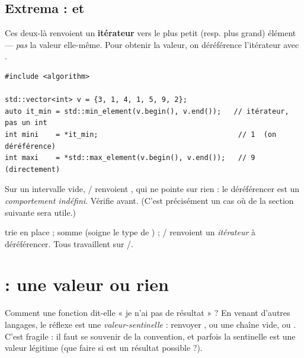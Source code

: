 \documentclass[11pt]{article}
\begin{document}
\subsection*{Extrema :  et }

Ces deux-là renvoient un \textbf{itérateur} vers le plus petit (resp. plus
grand) élément — \emph{pas} la valeur elle-même. Pour obtenir la valeur, on
déréférence l'itérateur avec \code{*}.

\begin{lstlisting}
#include <algorithm>

std::vector<int> v = {3, 1, 4, 1, 5, 9, 2};
auto it_min = std::min_element(v.begin(), v.end());   // itérateur, pas un int
int mini    = *it_min;                                 // 1  (on déréférence)
int maxi    = *std::max_element(v.begin(), v.end());   // 9  (directement)
\end{lstlisting}

\begin{piege}
Sur un intervalle vide, / renvoient
, qui ne pointe sur rien : le déréférencer est un \emph{comportement
indéfini}. Vérifie  avant. (C'est précisément un cas où
 de la section suivante sera utile.)
\end{piege}

\begin{aretenir}
 trie en place ;
 somme (soigne le type de ) ;
/ renvoient un \emph{itérateur} à
déréférencer. Tous travaillent sur /.
\end{aretenir}

\section{ : une valeur ou rien}

Comment une fonction dit-elle « je n'ai pas de résultat » ? En venant d'autres
langages, le réflexe est une \emph{valeur-sentinelle} : renvoyer , ou
une chaîne vide, ou . C'est fragile : il faut se souvenir de la
convention, et parfois la sentinelle est une valeur légitime (que faire si
 est un résultat possible ?).
\end{document}
